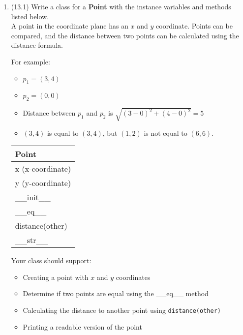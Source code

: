 \documentclass{article}
\begin{document}
\begin{enumerate}
\item (13.1)
		Write a class for a \textbf{Point} with the instance variables and methods listed below.\\
		A point in the coordinate plane has an $x$ and $y$ coordinate. Points can be compared, 
		and the distance between two points can be calculated using the distance formula.
			
		\begin{minipage}[t]{0.65\textwidth}
			For example:
			\begin{itemize}
				\item $p_1 = (3, 4)$
				\item $p_2 = (0, 0)$
				\item Distance between $p_1$ and $p_2$ is $\sqrt{(3 - 0)^2 + (4 - 0)^2} = 5$
				\item $(3,4)$ is equal to $(3,4)$, but $(1,2)$ is not equal to $(6,6)$.
			\end{itemize}
		\end{minipage}
		\hfill
		\begin{minipage}[t]{0.32\textwidth}
			\vspace{.2em}
			\begin{flushright}
				\begin{tabular}{|l|}
					\hline
					Point \\ \hline
					x (x-coordinate) \\
					y (y-coordinate) \\ \hline
					\_\_init\_\_ \\
					\_\_eq\_\_ \\
					distance(other) \\
					\_\_str\_\_ \\ \hline
				\end{tabular}
			\end{flushright}
		\end{minipage}
		
		Your class should support:
		\begin{itemize}
			\item Creating a point with $x$ and $y$ coordinates
			\item Determine if two points are equal using the \_\_eq\_\_  method	
			\item Calculating the distance to another point using \texttt{distance(other)}
			\item Printing a readable version of the point
		\end{itemize}
		

\end{enumerate}
\end{document}

